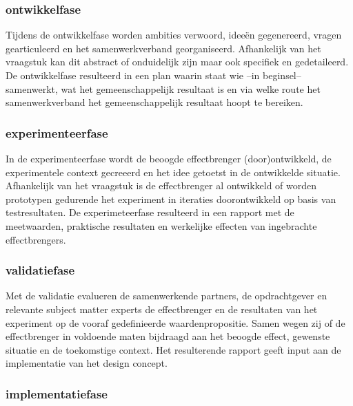 \documentclass[
]{book}
\begin{document}
\hypertarget{ontwikkelfase}{%
\subsubsection{ontwikkelfase}\label{ontwikkelfase}}

Tijdens de ontwikkelfase worden ambities verwoord, ideeën gegenereerd, vragen gearticuleerd en het samenwerkverband georganiseerd. Afhankelijk van het vraagstuk kan dit abstract of onduidelijk zijn maar ook specifiek en gedetaileerd. De ontwikkelfase resulteerd in een plan waarin staat wie --in beginsel-- samenwerkt, wat het gemeenschappelijk resultaat is en via welke route het samenwerkverband het gemeenschappelijk resultaat hoopt te bereiken.

\hypertarget{experimenteerfase}{%
\subsubsection{experimenteerfase}\label{experimenteerfase}}

In de experimenteerfase wordt de beoogde effectbrenger (door)ontwikkeld, de experimentele context gecreeerd en het idee getoetst in de ontwikkelde situatie. Afhankelijk van het vraagstuk is de effectbrenger al ontwikkeld of worden prototypen gedurende het experiment in iteraties doorontwikkeld op basis van testresultaten. De experimeteerfase resulteerd in een rapport met de meetwaarden, praktische resultaten en werkelijke effecten van ingebrachte effectbrengers.

\hypertarget{validatiefase}{%
\subsubsection{validatiefase}\label{validatiefase}}

Met de validatie evalueren de samenwerkende partners, de opdrachtgever en relevante subject matter experts de effectbrenger en de resultaten van het experiment op de vooraf gedefinieerde waardenpropositie. Samen wegen zij of de effectbrenger in voldoende maten bijdraagd aan het beoogde effect, gewenste situatie en de toekomstige context. Het resulterende rapport geeft input aan de implementatie van het design concept.

\hypertarget{implementatiefase}{%
\subsubsection{implementatiefase}\label{implementatiefase}}
\end{document}
